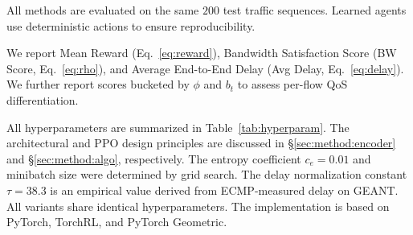 All methods are evaluated on the same $200$ test traffic sequences. 
Learned agents use deterministic actions to ensure reproducibility.

We report Mean Reward (Eq.~\eqref{eq:reward}), Bandwidth Satisfaction Score (BW Score, Eq.~\eqref{eq:rho}), and Average End-to-End Delay (Avg Delay, Eq.~\eqref{eq:delay}). We further report scores bucketed by $\phi$ and $b_t$ to assess per-flow QoS differentiation.


All hyperparameters are summarized in Table~\ref{tab:hyperparam}.
The architectural and PPO design principles are discussed in \S\ref{sec:method:encoder} and \S\ref{sec:method:algo}, respectively.
The entropy coefficient $c_e=0.01$ and minibatch size were determined by grid search.
The delay normalization constant $\tau=38.3$ is an empirical value derived from ECMP-measured delay on GEANT.
All variants share identical hyperparameters.
The implementation is based on PyTorch, TorchRL, and PyTorch Geometric.
